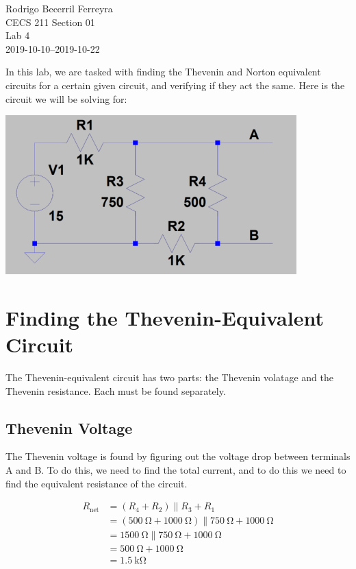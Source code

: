 \documentclass{article}
\begin{document}
\begin{flushright}
    \noindent
    Rodrigo Becerril Ferreyra\\
    CECS 211 Section 01\\
    Lab 4\\
    2019-10-10--2019-10-22
\end{flushright}

\indent
In this lab, we are tasked with finding the Thevenin and Norton
equivalent circuits for a certain given circuit, and verifying
if they act the same. Here is the circuit we will be
solving for:

\includegraphics{Images/circuit0.png}

\section{Finding the Thevenin-Equivalent Circuit} The
Thevenin-equivalent circuit has two parts: the Thevenin
volatage and the Thevenin resistance. Each must be found
separately.

\subsection{Thevenin Voltage} The Thevenin voltage is found
by figuring out the voltage drop between terminals A and B.
To do this, we need to find the total current, and to do
this we need to find the equivalent resistance of the
circuit.

\begin{align*}
    R_{\text{net}}
    &= (R_4 + R_2) \parallel R_3 + R_1 \\
    &= (\SI{500}{\ohm} + \SI{1000}{\ohm}) \parallel \SI{750}{\ohm} + \SI{1000}{\ohm}\\
    &= \SI{1500}{\ohm} \parallel \SI{750}{\ohm} + \SI{1000}{\ohm}\\
    &= \SI{500}{\ohm} + \SI{1000}{\ohm} \\
    &= \SI{1.5}{\kilo\ohm}
\end{align*}
\end{document}
